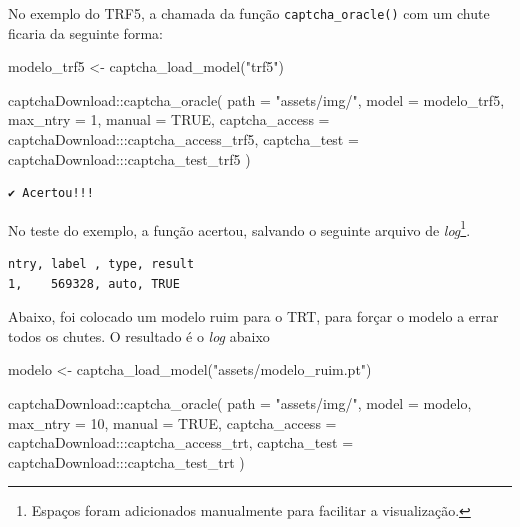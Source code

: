 \documentclass[12pt,twoside,brazilian]{book}
\newenvironment{Shaded}{\begin{snugshade}}{\end{snugshade}}
\newcommand{\AttributeTok}[1]{\textcolor[rgb]{0.40,0.45,0.13}{#1}}
\newcommand{\ConstantTok}[1]{\textcolor[rgb]{0.56,0.35,0.01}{#1}}
\newcommand{\DecValTok}[1]{\textcolor[rgb]{0.68,0.00,0.00}{#1}}
\newcommand{\FunctionTok}[1]{\textcolor[rgb]{0.28,0.35,0.67}{#1}}
\newcommand{\NormalTok}[1]{\textcolor[rgb]{0.00,0.23,0.31}{#1}}
\newcommand{\OtherTok}[1]{\textcolor[rgb]{0.00,0.23,0.31}{#1}}
\newcommand{\SpecialCharTok}[1]{\textcolor[rgb]{0.37,0.37,0.37}{#1}}
\newcommand{\StringTok}[1]{\textcolor[rgb]{0.13,0.47,0.30}{#1}}
\begin{document}
No exemplo do TRF5, a chamada da função \texttt{captcha\_oracle()} com
um chute ficaria da seguinte forma:

\begin{Shaded}
\begin{Highlighting}[]
\NormalTok{modelo\_trf5 }\OtherTok{\textless{}{-}} \FunctionTok{captcha\_load\_model}\NormalTok{(}\StringTok{"trf5"}\NormalTok{)}

\NormalTok{captchaDownload}\SpecialCharTok{::}\FunctionTok{captcha\_oracle}\NormalTok{(}
  \AttributeTok{path =} \StringTok{"assets/img/"}\NormalTok{,}
  \AttributeTok{model =}\NormalTok{ modelo\_trf5, }
  \AttributeTok{max\_ntry =} \DecValTok{1}\NormalTok{,}
  \AttributeTok{manual =} \ConstantTok{TRUE}\NormalTok{, }
  \AttributeTok{captcha\_access =}\NormalTok{ captchaDownload}\SpecialCharTok{:::}\NormalTok{captcha\_access\_trf5,}
  \AttributeTok{captcha\_test =}\NormalTok{ captchaDownload}\SpecialCharTok{:::}\NormalTok{captcha\_test\_trf5}
\NormalTok{)}
\end{Highlighting}
\end{Shaded}

\begin{verbatim}
✔ Acertou!!!
\end{verbatim}

No teste do exemplo, a função acertou, salvando o seguinte arquivo de
\emph{log}\footnote{Espaços foram adicionados manualmente para facilitar
  a visualização.}.

\begin{verbatim}
ntry, label , type, result
1,    569328, auto, TRUE
\end{verbatim}

Abaixo, foi colocado um modelo ruim para o TRT, para forçar o modelo a
errar todos os chutes. O resultado é o \emph{log} abaixo

\begin{Shaded}
\begin{Highlighting}[]
\NormalTok{modelo }\OtherTok{\textless{}{-}} \FunctionTok{captcha\_load\_model}\NormalTok{(}\StringTok{"assets/modelo\_ruim.pt"}\NormalTok{)}

\NormalTok{captchaDownload}\SpecialCharTok{::}\FunctionTok{captcha\_oracle}\NormalTok{(}
  \AttributeTok{path =} \StringTok{"assets/img/"}\NormalTok{,}
  \AttributeTok{model =}\NormalTok{ modelo, }
  \AttributeTok{max\_ntry =} \DecValTok{10}\NormalTok{,}
  \AttributeTok{manual =} \ConstantTok{TRUE}\NormalTok{, }
  \AttributeTok{captcha\_access =}\NormalTok{ captchaDownload}\SpecialCharTok{:::}\NormalTok{captcha\_access\_trt,}
  \AttributeTok{captcha\_test =}\NormalTok{ captchaDownload}\SpecialCharTok{:::}\NormalTok{captcha\_test\_trt}
\NormalTok{)}
\end{Highlighting}
\end{Shaded}
\end{document}
